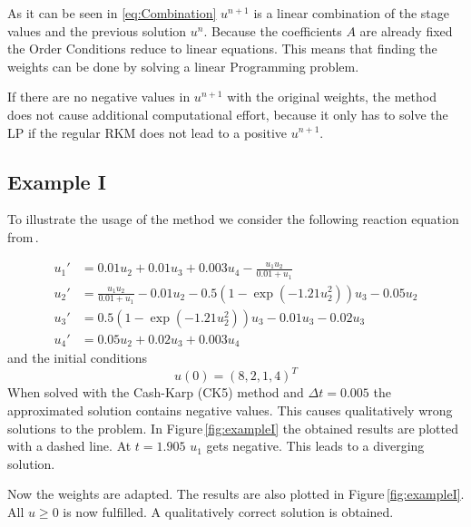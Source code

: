 \documentclass[a4paper]{scrartcl}
\numberwithin{equation}{section}
\theoremstyle{plain}
\theoremstyle{definition}
\numberwithin{theorem}{section}
\newcommand{\dt}{{\Delta t}}
\newcommand{\1}{\mathbbm{1}}
\begin{document}
As it can be seen in \eqref{eq:Combination} $u^{n+1}$ is a linear combination of the stage values and the previous solution $u^n$.
Because the coefficients $A$ are already fixed the Order Conditions reduce to linear equations.
This means that finding the weights can be done by solving a linear Programming problem.
 
If there are no negative values in $u^{n+1}$ with the original weights, the method does not cause additional computational effort, because it only has to solve the LP if the regular RKM does not lead to a positive $u^{n+1}$. %



\subsection{Example I}\label{sec:example_reac}

To illustrate the usage of the method we consider the following reaction equation from\,\cite{kopecz_comparison_2019}.

\begin{subequations}
\label{eq:Reaction}
\begin{align}
u_1' &= 0.01u_2 + 0.01 u_3 +0.003u_4 - \frac{u_1 u_2}{0.01+u_1} \\ 
u_2' &= \frac{u_1u_2}{0.01+u_1}-0.01 u_2-0.5(1-\exp(-1.21 u_2^2)) u_3 -0.05 u_2 \\ 
u_3' &= 0.5(1-\exp(-1.21u_2^2)) u_3 - 0.01 u_3 -0.02 u_3 \\ 
u_4' &=0.05 u_2 + 0.02 u_3 + 0.003u_4 
\end{align}
\end{subequations}
and the initial conditions
\begin{equation}
u(0) = (8,2,1,4)^T
\end{equation}
When solved with the Cash-Karp (CK5) method and $\dt = 0.005$ the approximated solution contains negative values. This causes qualitatively wrong solutions to the problem. 
In Figure\,\ref{fig:exampleI} the obtained results are plotted with a dashed line. 
At $t=1.905$ $u_1$ gets negative. This leads to a diverging solution.

Now the weights are adapted. The results are also plotted in Figure\,\ref{fig:exampleI}. 
All $u\geq0$ is now fulfilled. A qualitatively correct solution is obtained.
\end{document}
